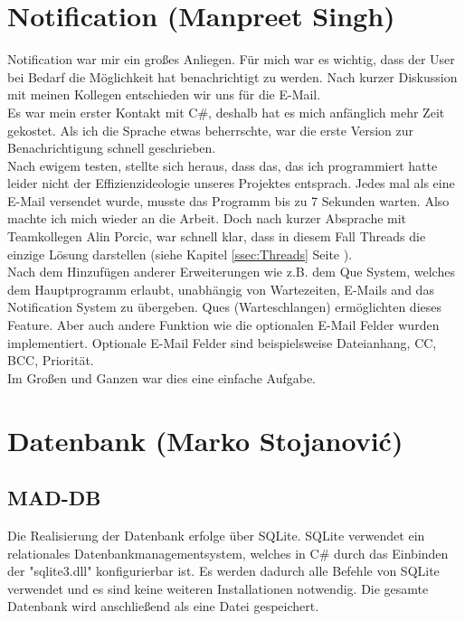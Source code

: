 \documentclass[12pt,a4paper]{report}
\begin{document}
\begin{onehalfspace}
\chapter{Notification (Manpreet Singh)}
Notification war mir ein großes Anliegen. Für mich war es wichtig, dass der User bei Bedarf die Möglichkeit hat benachrichtigt zu werden. Nach kurzer Diskussion mit meinen Kollegen entschieden wir uns für die E-Mail.\\

Es war mein erster Kontakt mit C\#, deshalb hat es mich anfänglich mehr Zeit gekostet. Als ich die Sprache etwas beherrschte, war die erste Version zur Benachrichtigung schnell geschrieben. \\

Nach ewigem testen, stellte sich heraus, dass das, das ich programmiert hatte leider nicht der Effizienzideologie unseres Projektes entsprach. Jedes mal als eine E-Mail versendet wurde, musste das Programm bis zu 7 Sekunden warten. Also machte ich mich wieder an die Arbeit. Doch nach kurzer Absprache mit Teamkollegen Alin Porcic, war schnell klar, dass in diesem Fall Threads die einzige Lösung darstellen (siehe Kapitel \ref{ssec:Threads} Seite \pageref{ssec:Threads}).\\

Nach dem Hinzufügen anderer Erweiterungen wie z.B. dem Que System, welches dem Hauptprogramm erlaubt, unabhängig von Wartezeiten, E-Mails and das Notification System zu übergeben. Ques (Warteschlangen) ermöglichten dieses Feature. Aber auch andere Funktion wie die optionalen E-Mail Felder wurden implementiert. Optionale E-Mail Felder sind beispielsweise Dateianhang, CC, BCC, Priorität.\\

Im Großen und Ganzen war dies eine einfache Aufgabe.

\chapter{Datenbank (Marko Stojanovi\'{c})}

\section{MAD-DB}
Die Realisierung der Datenbank erfolge über SQLite. SQLite verwendet ein relationales Datenbankmanagementsystem, welches in C\# durch das Einbinden der "{}sqlite3.dll"{} konfigurierbar ist. Es werden dadurch alle Befehle von SQLite verwendet und es sind keine weiteren Installationen notwendig. Die gesamte Datenbank wird anschließend als eine Datei gespeichert.


\end{onehalfspace}
\end{document}
